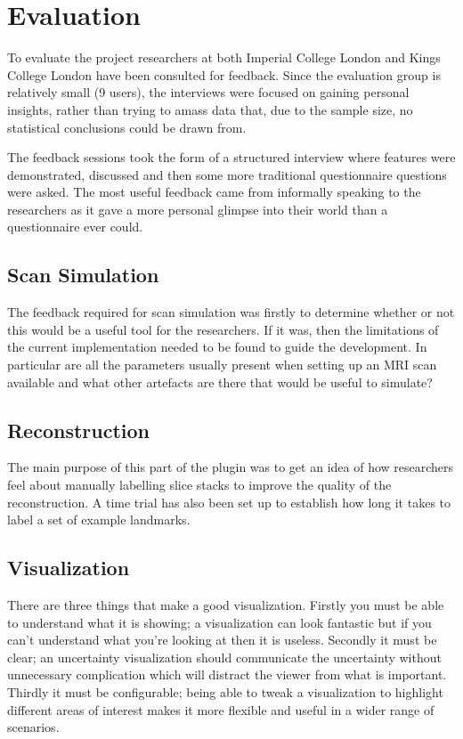 \chapter{Evaluation}\label{chapter:evaluation}

To evaluate the project researchers at both Imperial College London and Kings College London have been consulted for feedback. Since the evaluation group is relatively small (9 users), the interviews were focused on gaining personal insights, rather than trying to amass data that, due to the sample size, no statistical conclusions could be drawn from.

The feedback sessions took the form of a structured interview where features were demonstrated, discussed and then some more traditional questionnaire questions were asked. The most useful feedback came from informally speaking to the researchers as it gave a more personal glimpse into their world than a questionnaire ever could.

\section{Scan Simulation}\label{evaluation:scan_simulation}
The feedback required for scan simulation was firstly to determine whether or not this would be a useful tool for the researchers. If it was, then the limitations of the current implementation needed to be found to guide the development. In particular are all the parameters usually present when setting up an MRI scan available and what other artefacts are there that would be useful to simulate?

\section{Reconstruction}\label{evaluation:reconstruction}
The main purpose of this part of the plugin was to get an idea of how researchers feel about manually labelling slice stacks to improve the quality of the reconstruction. A time trial has also been set up to establish how long it takes to label a set of example landmarks.

\section{Visualization}\label{results:visualization}
There are three things that make a good visualization. Firstly you must be able to understand what it is showing; a visualization can look fantastic but if you can't understand what you're looking at then it is useless. Secondly it must be clear; an uncertainty visualization should communicate the uncertainty without unnecessary complication which will distract the viewer from what is important. Thirdly it must be configurable; being able to tweak a visualization to highlight different areas of interest makes it more flexible and useful in a wider range of scenarios.